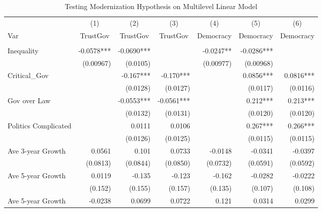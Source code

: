 \documentclass[12pt]{article}\usepackage[]{graphicx}\usepackage[]{color}
\begin{document}
\begin{table}[htbp]
	\centering
	\caption{\label{modernization} Testing Modernization Hypothesis on Multilevel Linear Model}
	\begin{tabular}{lrrrrrr}
	
		\hline
		& \multicolumn{1}{c}{(1)} & \multicolumn{1}{c}{(2)} & \multicolumn{1}{c}{(3)} & \multicolumn{1}{c}{(4)} & \multicolumn{1}{c}{(5)} & \multicolumn{1}{c}{(6)} \\
		Var   & \multicolumn{1}{c}{TrustGov} & \multicolumn{1}{c}{TrustGov} & \multicolumn{1}{c}{TrustGov} & \multicolumn{1}{c}{Democracy} & \multicolumn{1}{c}{Democracy} & \multicolumn{1}{c}{Democracy} \\
		& \multicolumn{1}{c}{} & \multicolumn{1}{c}{} & \multicolumn{1}{c}{} & \multicolumn{1}{c}{} & \multicolumn{1}{c}{} & \multicolumn{1}{c}{} \\
		\hline
	 Inequality & -0.0578*** & -0.0690*** &       & -0.0247** & -0.0286*** &  \\
	 & (0.00967) & (0.0105) &       & (0.00977) & (0.00968) &  \\
	 Critical\_Gov &       & -0.167*** & -0.170*** &       & 0.0856*** & 0.0816*** \\
	 &       & (0.0128) & (0.0127) &       & (0.0117) & (0.0116) \\
	 Gov over Law &       & -0.0553*** & -0.0561*** &       & 0.212*** & 0.213*** \\
	 &       & (0.0132) & (0.0131) &       & (0.0120) & (0.0120) \\
	 Politics Complicated &       & 0.0111 & 0.0106 &       & 0.267*** & 0.266*** \\
	 &       & (0.0126) & (0.0125) &       & (0.0115) & (0.0115) \\
	 Ave 3-year Growth & 0.0561 & 0.101 & 0.0733 & -0.0148 & -0.0341 & -0.0397 \\
	 & (0.0813) & (0.0844) & (0.0850) & (0.0732) & (0.0591) & (0.0592) \\
	 Ave 5-year Growth & 0.0119 & -0.135 & -0.123 & -0.162 & -0.0282 & -0.0222 \\
	 & (0.152) & (0.155) & (0.157) & (0.135) & (0.107) & (0.108) \\
	 Ave 5-year Growth & -0.0238 & 0.0699 & 0.0722 & 0.121 & 0.0314 & 0.0299 \\

\end{tabular}
\end{table}
\end{document}
